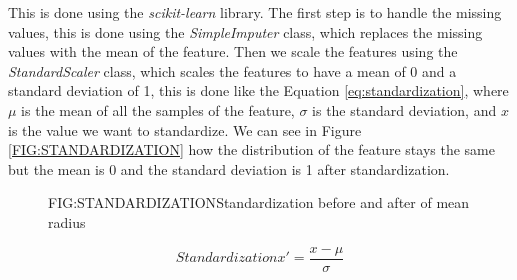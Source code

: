 This is done using the \textit{scikit-learn} library. The first step is to handle the missing values, this is done using the \textit{SimpleImputer} class, which replaces the missing values with the mean of the feature. Then we scale the features using the \textit{StandardScaler} class, which scales the features to have a mean of 0 and a standard deviation of 1, this is done like the Equation \ref{eq:standardization}, where $\mu$ is the mean of all the samples of the feature, $\sigma$ is the standard deviation, and $x$ is the value we want to standardize. We can see in Figure \ref{FIG:STANDARDIZATION} how the distribution of the feature stays the same but the mean is 0 and the standard deviation is 1 after standardization.

\begin{figure}[Standardization]{FIG:STANDARDIZATION}{Standardization before and after of mean radius}
\end{figure}

\begin{equation}[eq:standardization]{Standardization}
    \boxed{x' = \frac{x - \mu}{\sigma}}
\end{equation}

